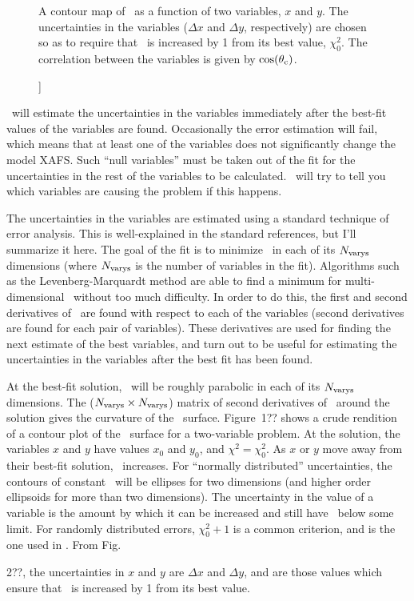 {%
\begin{figure}
\caption[chi-square]]{A contour map of \chisqr\ as a function of two
  variables, $x$ and $y$. The uncertainties in the variables ($\Delta x$
  and $\Delta y$, respectively) are chosen so as to require that \chisqr\ 
  is increased by 1 from its best value, $\chi^2_0$.  The correlation
  between the variables is given by $\cos(\theta_{\rm c})$.}
\end{figure}

\feffit\ will estimate the uncertainties in the variables immediately
after the best-fit values of the variables are found.  Occasionally
the error estimation will fail, which means that at least one of the
variables does not significantly change the model XAFS.  Such ``null
variables'' must be taken out of the fit for the uncertainties in the
rest of the variables to be calculated.  \feffit\ will try to tell you
which variables are causing the problem if this happens.

The uncertainties in the variables are estimated using a standard
technique of error analysis.  This is well-explained in the standard
references, but I'll summarize it here.  The goal of the fit is to
minimize \chisqr\ in each of its $N_{\rm varys}$ dimensions (where
$N_{\rm varys}$ is the number of variables in the fit).  Algorithms
such as the Levenberg-Marquardt method are able to find a minimum for
multi-dimensional \chisqr\ without too much difficulty.  In order to
do this, the first and second derivatives of \chisqr\ are found with
respect to each of the variables (second derivatives are found for
each pair of variables).  These derivatives are used for finding the
next estimate of the best variables, and turn out to be useful for
estimating the uncertainties in the variables after the best fit has
been found.

At the best-fit solution, \chisqr\ will be roughly parabolic in each
of its $N_{\rm varys}$ dimensions. The ($N_{\rm varys} \times N_{\rm
varys}$) matrix of second derivatives of \chisqr\ around the solution
gives the curvature of the \chisqr\ surface.  Figure~{1??}
shows a crude rendition of a contour plot of the \chisqr\ surface for
a two-variable problem.  At the solution, the variables $x$ and $y$
have values $x_0$ and $y_0$, and $\chi^2 = \chi^2_0$.  As $x$ or $y$
move away from their best-fit solution, \chisqr\ increases.  For
``normally distributed'' uncertainties, the contours of constant
\chisqr\ will be ellipses for two dimensions (and higher order
ellipsoids for more than two dimensions).  The uncertainty in the
value of a variable is the amount by which it can be increased and
still have \chisqr\ below some limit.  For randomly distributed
errors, $\chi^2_0 + 1$ is a common criterion, and is the one used in
\feffit.  From Fig.~{2??, the uncertainties in $x$ and
$y$ are $\Delta x$ and $\Delta y$, and are those values which ensure
that \chisqr\ is increased by 1 from its best value.  

}}

